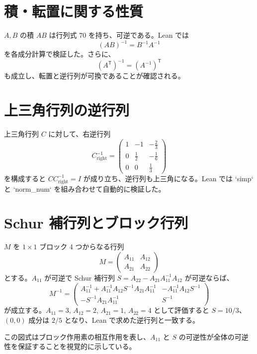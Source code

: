 \documentclass[12pt]{ltjsarticle}
\begin{document}
\section{積・転置に関する性質}
$A,B$ の積 $AB$ は行列式 $70$ を持ち、可逆である。Lean では
\[
(AB)^{-1} = B^{-1}A^{-1}
\]
を各成分計算で検証した。さらに、
\[
(A^{\mathsf{T}})^{-1} = (A^{-1})^{\mathsf{T}}
\]
も成立し、転置と逆行列が可換であることが確認される。

\section{上三角行列の逆行列}
上三角行列 $C$ に対して、右逆行列
\[
C^{-1}_{\text{right}} = \begin{pmatrix}
1 & -1 & -\tfrac{2}{3}\\
0 & \tfrac{1}{2} & -\tfrac{1}{6}\\
0 & 0 & \tfrac{1}{3}
\end{pmatrix}
\]
を構成すると $CC^{-1}_{\text{right}} = I$ が成り立ち、逆行列も上三角になる。Lean では `simp` と `norm_num` を組み合わせて自動的に検証した。

\section{Schur 補行列とブロック行列}
$M$ を $1\times1$ ブロック 4 つからなる行列
\[
M = \begin{pmatrix} A_{11} & A_{12} \\ A_{21} & A_{22} \end{pmatrix}
\]
とする。$A_{11}$ が可逆で Schur 補行列 $S = A_{22} - A_{21}A_{11}^{-1}A_{12}$ が可逆ならば、
\[
M^{-1} = \begin{pmatrix}
A_{11}^{-1} + A_{11}^{-1} A_{12} S^{-1} A_{21} A_{11}^{-1} & -A_{11}^{-1} A_{12} S^{-1} \\
- S^{-1} A_{21} A_{11}^{-1} & S^{-1}
\end{pmatrix}
\]
が成立する。$A_{11}=3$, $A_{12}=2$, $A_{21}=1$, $A_{22}=4$ として評価すると $S = 10/3$、$(0,0)$ 成分は $2/5$ となり、Lean で求めた逆行列と一致する。

\begin{center}
\end{center}
この図式はブロック作用素の相互作用を表し、$A_{11}$ と $S$ の可逆性が全体の可逆性を保証することを視覚的に示している。
\end{document}
